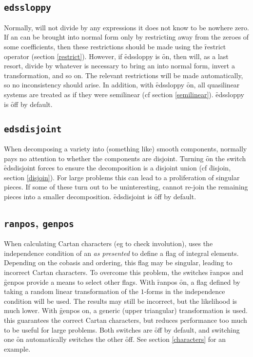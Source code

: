 \subsection{\texttt{edssloppy}}
\label{edssloppy}

Normally,  will not divide by any expressions it does not know to be
nowhere zero. If an  can be brought into normal form only by
restricting away from the zeroes of some coefficients, then these
restrictions should be made using the \f{restrict} operator (section
\ref{restrict}). However, if \f{edssloppy} is \f{on}, then  will, as a
last resort, divide by whatever is necessary to bring an  into
normal form, invert a transformation, and so on. The relevant restrictions
will be made automatically, so no inconsistency should arise. In addition,
with \f{edssloppy} \f{on}, all quasilinear systems are treated as if they
were semilinear (cf section \ref{semilinear}). \f{edssloppy} is \f{off} by
default.


\subsection{\texttt{edsdisjoint}}
\label{edsdisjoint}

When decomposing a variety into (something like) smooth components, 
normally pays no attention to whether the components are disjoint. Turning
\f{on} the switch \f{edsdisjoint} forces  to ensure the decomposition is
a disjoint union (cf \f{disjoin}, section \ref{disjoin}). For large
problems this can lead to a proliferation of singular pieces. If some of
these turn out to be uninteresting,  cannot re-join the remaining pieces
into a smaller decomposition. \f{edsdisjoint} is \f{off} by default.

\subsection{\texttt{ranpos}, \texttt{genpos}}
\label{ranpos}

When calculating Cartan characters (eg to check involution),  uses the
independence condition of an  \emph{as presented} to define a flag
of integral elements. Depending on the cobasis and ordering, this flag may
be singular, leading to incorrect Cartan characters. To overcome this
problem, the switches \f{ranpos} and \f{genpos} provide a means to select
other flags. With \f{ranpos} \f{on}, a flag defined by taking a random
linear transformation of the $1$-forms in the independence condition will be
used. The results may still be incorrect, but the likelihood is much lower.
With \f{genpos} on, a generic (upper triangular) transformation is
used. this guarantees the correct Cartan characters, but reduces
performance too much to be useful for large problems. Both switches are
\f{off} by default, and switching one \f{on} automatically switches the other
\f{off}. See section \ref{characters} for an example.


